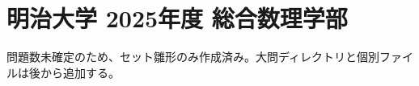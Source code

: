 \documentclass[../../uem_mat_mei_q.tex]{subfiles}
\begin{document}
    \section{明治大学 2025年度 総合数理学部}

    問題数未確定のため、セット雛形のみ作成済み。大問ディレクトリと個別ファイルは後から追加する。
\end{document}
